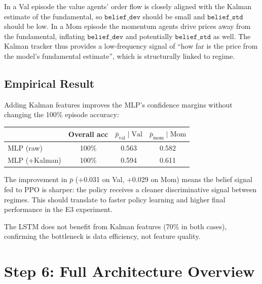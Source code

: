 \documentclass[11pt]{article}
\begin{document}
In a Val episode the value agents' order flow is closely aligned with the
Kalman estimate of the fundamental, so $\texttt{belief\_dev}$ should be small
and $\texttt{belief\_std}$ should be low.  In a Mom episode the momentum
agents drive prices away from the fundamental, inflating
$\texttt{belief\_dev}$ and potentially $\texttt{belief\_std}$ as well.  The
Kalman tracker thus provides a low-frequency signal of ``how far is the price
from the model's fundamental estimate'', which is structurally linked to regime.

\subsection{Empirical Result}

Adding Kalman features improves the MLP's confidence margins without
changing the 100\% episode accuracy:

\begin{center}
\begin{tabular}{lccc}
\toprule
 & \textbf{Overall acc} & $\bar{p}_\text{val}\mid\text{Val}$ & $\bar{p}_\text{mom}\mid\text{Mom}$ \\
\midrule
MLP (raw)         & 100\% & 0.563 & 0.582 \\
MLP (+Kalman)     & 100\% & 0.594 & 0.611 \\
\bottomrule
\end{tabular}
\end{center}

\noindent
The improvement in $\bar{p}$ (+0.031 on Val, +0.029 on Mom) means the belief
signal fed to PPO is sharper: the policy receives a cleaner discriminative
signal between regimes.  This should translate to faster policy learning and
higher final performance in the E3 experiment.

The LSTM does not benefit from Kalman features (70\% in both cases), confirming
the bottleneck is data efficiency, not feature quality.

\section{Step 6: Full Architecture Overview}
\end{document}
